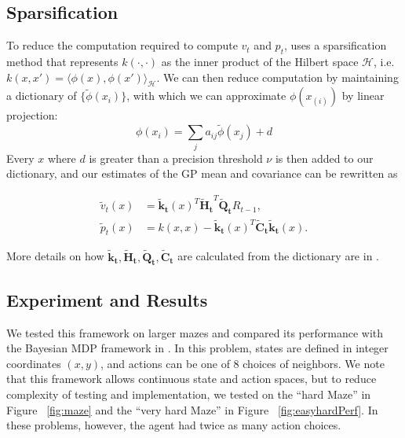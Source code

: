 \documentclass[10pt, twocolumn, twoside]{article}
\begin{document}
\subsection{Sparsification}
To reduce the computation required to compute $v_t$ and $p_t$, \cite{engel} uses a sparsification
method that represents $k(\cdot, \cdot)$ as the inner product of the Hilbert space $\mathcal{H}$, i.e.
$k(x, x') = \langle \phi(x), \phi(x') \rangle_{\mathcal{H}}$. We can then reduce computation by maintaining
a dictionary of $\{\tilde{\phi}(x_i)\}$, with which we can approximate $\phi(x_{(i)})$ by linear projection:
$$\phi(x_i) = \sum_j a_{ij} \tilde{\phi}(x_j) + d$$
Every $x$ where $d$ is greater than a precision threshold $\nu$ is then added to our dictionary, and
our estimates of the GP mean and covariance can be rewritten as

\newcommand{\ktilde}{\mathbf{\tilde{k}_t}}
\newcommand{\Htilde}{\mathbf{\tilde{H}_t}}
\newcommand{\Qtilde}{\mathbf{\tilde{Q}_t}}
\newcommand{\Ctilde}{\mathbf{\tilde{C}_t}}

\begin{align*}
\tilde{v}_t(x) &= \ktilde(x)^T \Htilde^T \Qtilde R_{t-1},\\
\tilde{p}_t(x) &= k(x, x) - \ktilde(x)^T \Ctilde \ktilde(x).
\end{align*}

More details on how $\ktilde, \Htilde, \Qtilde, \Ctilde$ are calculated from the dictionary are in
\cite{engel}.

\subsection{Experiment and Results}
We tested this framework on larger mazes and compared its performance with the Bayesian MDP framework
in \cite{strens}. In this problem, states are defined in integer coordinates $(x, y)$, and actions can
be one of 8 choices of neighbors. We note that this framework allows continuous state and action spaces, 
but to reduce complexity of testing and implementation, we tested on the ``hard Maze'' in Figure
~\ref{fig:maze} and the ``very hard Maze'' in Figure ~\ref{fig:easyhardPerf}. In these problems, however,
the agent had twice as many action choices.
\end{document}
